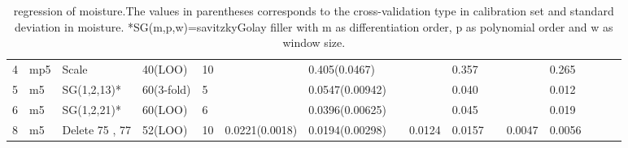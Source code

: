 \documentclass[a4paper,12pt,titlepage]{article} %
\numberwithin{equation}{section}  %
\begin{document}
\begin{landscape}
\begin{table}[]
\begin{tabular}{llllllllllllllll}
				4                    & mp5                  & Scale                & 40(LOO)    & 10 &                  & 0.405(0.0467)   &   &        & 0.357  &   &         & 0.265   &   &   &   \\
				5                    & m5                   & SG(1,2,13)*           & 60(3-fold) & 5  &                  & 0.0547(0.00942) &   &        & 0.040  &   &         & 0.012   &   &   &   \\
				6                    & m5                   & SG(1,2,21)*           & 60(LOO)    & 6  &                  & 0.0396(0.00625) &   &        & 0.045  &   &         & 0.019   &   &   &   \\
				8                    & m5                   & Delete 75 , 77       & 52(LOO)    & 10 & 0.0221(0.0018)   & 0.0194(0.00298) &   & 0.0124 & 0.0157 &   & 0.0047  & 0.0056  &   &   &   
			\end{tabular}
			
			\caption{regression of moisture.The values in parentheses corresponds to the cross-validation type in calibration set and standard deviation in moisture.
			*SG(m,p,w)=savitzkyGolay filler with m as differentiation order, p as polynomial order and w as window size.}
			\label{tab:moisture}
		\end{table}
		
		
		
		

		
		\begin{table}[]
			

\end{table}
\end{landscape}
\end{document}
